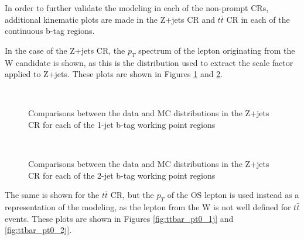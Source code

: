 
In order to further validate the modeling in each of the non-prompt CRs, additional kinematic plots are made in the Z+jets CR and $t\bar{t}$ CR in each of the continuous b-tag regions.

In the case of the Z+jets CR, the $p_T$ spectrum of the lepton originating from the W candidate is shown, as this is the distribution used to extract the scale factor applied to Z+jets. These plots are shown in Figures \ref{fig:zjets_ptW_1j} and \ref{fig:zjets_ptW_2j}.

\begin{figure}[H]
    \centering                                                                                                               
    \\
    \caption{Comparisons between the data and MC distributions in the Z+jets CR for each of the 1-jet b-tag working point regions}
   \label{fig:zjets_ptW_1j}
\end{figure}

\begin{figure}[H]
    \centering
    \\
    \caption{Comparisons between the data and MC distributions in the Z+jets CR for each of the 2-jet b-tag working point regions}
   \label{fig:zjets_ptW_2j}
\end{figure}

The same is shown for the $t\bar{t}$ CR, but the $p_T$ of the OS lepton is used instead as a representation of the modeling, as the lepton from the W is not well defined for $t\bar{t}$ events. These plots are shown in Figures \ref{fig:ttbar_pt0_1j} and \ref{fig:ttbar_pt0_2j}.

